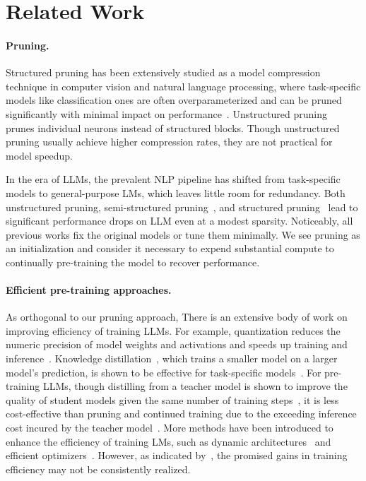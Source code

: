 
\section{Related Work}
\paragraph{Pruning.}
Structured pruning has been extensively studied as a model compression technique in computer vision and natural language processing, 
where task-specific models like  classification ones are often overparameterized and can be pruned significantly with minimal impact on performance~\citep{han2016deep, wen2016learning,liu2017learning,luo2017thinet, cai2019once, deng2020model,hou2020dynabert, wang2020structured, lagunas2021block, xia-etal-2022-structured, kurtic2023ziplm}. 
Unstructured pruning~\citep{frankle2018lottery,li2020train, chen2020lottery, sanh2020movement} prunes individual neurons instead of structured blocks.
Though unstructured pruning usually achieve higher compression rates,
they are  not practical for model speedup.

In the era of LLMs, 
the prevalent NLP pipeline has shifted from task-specific models 
to general-purpose LMs,
which leaves little room for redundancy. 
Both unstructured pruning, 
semi-structured pruning~\citep{frantar2023sparsegpt,sun2023simple}, 
and structured pruning~\citep{ma2023llm}
lead to significant performance drops on LLM even at a modest sparsity.
Noticeably, all previous works 
fix the original models or tune them minimally.
We
see pruning as an initialization and 
consider it necessary to expend substantial compute to 
continually pre-training the model to recover performance. 

\paragraph{Efficient pre-training approaches.}
As orthogonal to our pruning approach, 
There is an extensive body of work on improving efficiency of training LLMs. 
For example, 
quantization reduces the numeric precision of  model weights and activations 
and speeds up training and inference~\citep{dettmers2022llm,dettmers2023qlora,xiao2023smoothquant}.
Knowledge distillation~\citep{hinton2015distilling,sanh2019distilbert,jiao2020tinybert,sun2020mobilebert}, 
which trains a smaller model on a larger model's prediction,
is shown to be effective for task-specific models~\citep{xia-etal-2022-structured}. For pre-training LLMs, though distilling from a teacher model is shown to improve the quality of student models given the same number of training steps~\citep{rae2021scaling, blakeney2022reduce}, it is less cost-effective than pruning and continued training due to the exceeding inference cost incured by the teacher model~\citep{jha2023large}. More  methods have been introduced to enhance the efficiency of training LMs, 
such as dynamic architectures~\citep{gong2019efficient,zhang2020accelerating} and efficient optimizers~\citep{chen2023symbolic, liu2023sophia}. However, 
as indicated by~\citep{kaddour2023no,bartoldson2023compute},
the promised gains in training efficiency may not be consistently realized.

